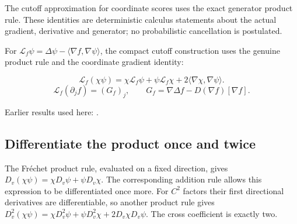 \documentclass[11pt,a4paper]{report}
\begin{document}
The cutoff approximation for coordinate scores uses the exact generator product rule. These identities are deterministic calculus statements about the actual gradient, derivative and generator; no probabilistic cancellation is postulated.



For \(\mathcal L_f\psi=\Delta\psi-\langle\nabla f,\nabla\psi\rangle\), the compact cutoff construction uses the genuine product rule and the coordinate gradient identity:


\[\mathcal L_f(\chi\psi)=\chi\mathcal L_f\psi+\psi\mathcal L_f\chi+2\langle\nabla\chi,\nabla\psi\rangle.\]
\[\mathcal L_f(\partial_jf)=(G_f)_j,\qquad G_f=\nabla\Delta f-D(\nabla f)[\nabla f].\]

Earlier results used here: \cite[Section~3.46]{LangevinLean2026ULASC}.
\subsection{\texorpdfstring{Differentiate the product once and twice}{Differentiate the product once and twice}}
\label{report-step-AverageLMC-GeneratorProduct-lean-1}


The Fréchet product rule, evaluated on a fixed direction, gives \(D_{v}(\chi \psi )=\chi D_{v}\psi +\psi D_{v}\chi\). The corresponding addition rule allows this expression to be differentiated once more. For \(C^{2}\) factors their first directional derivatives are differentiable, so another product rule gives \(D_{v}^{2}(\chi \psi )=\chi D_{v}^{2}\psi +\psi D_{v}^{2}\chi +2D_{v}\chi D_{v}\psi\). The cross coefficient is exactly two.
\end{document}
